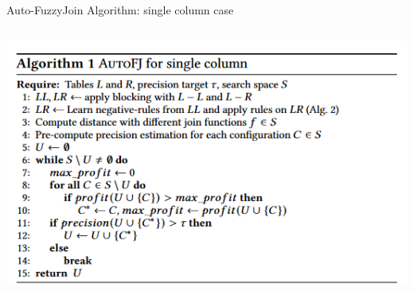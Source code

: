 \documentclass[8pt]{beamer} %
\begin{document}
\begin{frame}{Auto-FuzzyJoin Algorithm: single column case}
\begin{columns}
		\begin{column}{0.45\textwidth}
			\centering
			\includegraphics[width=\linewidth]{img/autofj-algorithm.png}
		\end{column}
	\end{columns}
\end{frame}
\end{document}
